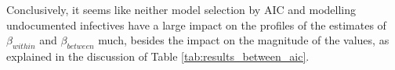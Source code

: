\documentclass[12pt]{article}
\begin{document}
	Conclusively, it seems like neither model selection by AIC and modelling undocumented infectives have a large impact on the profiles of the estimates of $\beta_{within}$ and $\beta_{between}$ much, besides the impact on the magnitude of the values, as explained in the discussion of Table \ref{tab:results_between_aic}.
	
	
	
	
\end{document}

